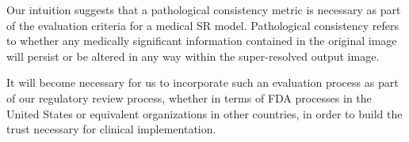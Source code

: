 Our intuition suggests that a pathological consistency metric is necessary as part of the evaluation criteria for a medical SR model. Pathological consistency refers to whether any medically significant information contained in the original image will persist or be altered in any way within the super-resolved output image.

It will become necessary for us to incorporate such an evaluation process as part of our regulatory review process, whether in terms of FDA processes in the United States or equivalent organizations in other countries, in order to build the trust necessary for clinical implementation.